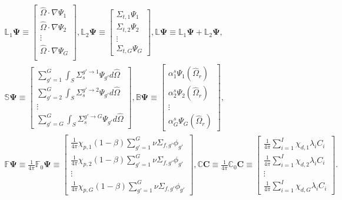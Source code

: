 \begin{gather}
  \mathbb{L}_1\bm{\Psi} \equiv
  \begin{bmatrix}
    \hat{\Omega}\cdot\nabla\Psi_1 \\
    \hat{\Omega}\cdot\nabla\Psi_2 \\
    \vdots \\
    \hat{\Omega}\cdot\nabla\Psi_G \\
  \end{bmatrix},
  \mathbb{L}_2\bm{\Psi} \equiv
  \begin{bmatrix}
    \Sigma_{t,1}\Psi_1 \\
    \Sigma_{t,2}\Psi_2 \\
    \vdots \\
    \Sigma_{t,G}\Psi_G
  \end{bmatrix},
  \mathbb{L}\bm{\Psi} \equiv \mathbb{L}_1\bm{\Psi} + \mathbb{L}_2\bm{\Psi}, \nonumber \\
  \mathbb{S}\bm{\Psi} \equiv
  \begin{bmatrix}
    \sum^G_{g'=1}\int_S \Sigma_s^{g'\rightarrow 1}\Psi_{g'}d\hat{\Omega} \\
    \sum^G_{g'=2}\int_S \Sigma_s^{g'\rightarrow 2}\Psi_{g'}d\hat{\Omega} \\
    \vdots \\
    \sum^G_{g'=G}\int_S \Sigma_s^{g'\rightarrow G}\Psi_{g'}d\hat{\Omega}
  \end{bmatrix},
  \mathbb{B}\bm{\Psi} \equiv
  \begin{bmatrix}
    \alpha^s_1\Psi_1(\hat{\Omega}_r) \\
    \alpha^s_2\Psi_2(\hat{\Omega}_r) \\
    \vdots \\
    \alpha^s_G\Psi_G(\hat{\Omega}_r)
  \end{bmatrix}, \nonumber \\
  \mathbb{F}\bm{\Psi} \equiv \frac{1}{4\pi}\mathbb{F}_0\bm{\Psi} \equiv
  \begin{bmatrix}
    \frac{1}{4\pi}\chi_{p,1}(1-\beta)\sum^G_{g'=1}\nu\Sigma_{f,g'}\phi_{g'} \\
    \frac{1}{4\pi}\chi_{p,2}(1-\beta)\sum^G_{g'=1}\nu\Sigma_{f,g'}\phi_{g'} \\
    \vdots \\
    \frac{1}{4\pi}\chi_{p,G}(1-\beta)\sum^G_{g'=1}\nu\Sigma_{f,g'}\phi_{g'}
  \end{bmatrix},
  \mathbb{C}\bm{C} \equiv \frac{1}{4\pi}\mathbb{C}_0\bm{C} \equiv
  \begin{bmatrix}
    \frac{1}{4\pi}\sum^I_{i=1}\chi_{d,1} \lambda_i C_i \\
    \frac{1}{4\pi}\sum^I_{i=1}\chi_{d,2} \lambda_i C_i \\
    \vdots \\
    \frac{1}{4\pi}\sum^I_{i=1}\chi_{d,G} \lambda_i C_i
  \end{bmatrix}. \nonumber
\end{gather}
